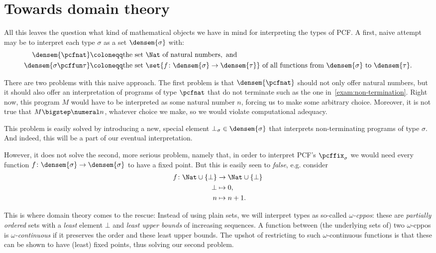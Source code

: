 \section{Towards domain theory}

All this leaves the question what kind of mathematical objects we have in mind
for interpreting the types of PCF. A first, naive attempt may be to interpret
each type \(\sigma\) as a set \(\densem{\sigma}\) with:
\begin{align*}
  \densem{\pcfnat} &\coloneqq \text{the set \(\Nat\) of natural numbers}, \text{ and} \\
  \densem{\sigma \pcffun \tau} &\coloneqq \text{the set \(\set{f \colon \densem{\sigma} \to
    \densem{\tau}}\) of all functions from \(\densem{\sigma}\) to \(\densem{\tau}\)}.
\end{align*}

There are two problems with this naive approach.
%
The first problem is that \(\densem{\pcfnat}\) should not only offer natural
numbers, but it should also offer an interpretation of programs of type
\(\pcfnat\) that do not terminate such as the one
in~\cref{exam:non-termination}.
%
Right now, this program \(M\) would have to be interpreted as some natural
number \(n\), forcing us to make some arbitrary choice. Moreover, it is not true
that \(M \bigstep \numeral n\), whatever choice we make, so we would violate
computational adequacy.

This problem is easily solved by introducing a new, special element
\(\bot_\sigma \in \densem{\sigma}\) that interprets non-terminating programs
of type \(\sigma\). And indeed, this will be a part of our eventual interpretation.

However, it does not solve the second, more serious problem, namely that, in
order to interpret PCF's \(\pcffix_\sigma\) we would need every function
\(f \colon \densem{\sigma} \to \densem{\sigma}\) to have a fixed point.
%
But this is easily seen to \emph{false}, e.g. consider
\begin{align*}
  f \colon \Nat \cup \{\bot\} &\to \Nat \cup \{\bot\} \\
  \bot &\mapsto 0, \\
  n &\mapsto n+1.
\end{align*}

This is where domain theory comes to the rescue: Instead of using plain sets, we
will interpret types as so-called \emph{\(\omega\)-cppos}: these are
\emph{partially ordered} sets with a \emph{least} element \(\bot\) and
\emph{least upper bounds} of increasing sequences.
%
A function between (the underlying sets of) two \(\omega\)-cppos is
\emph{\(\omega\)-continuous} if it preserves the order and these least upper
bounds.
%
The upshot of restricting to such \(\omega\)-continuous functions is that these
can be shown to have (least) fixed points, thus solving our second problem.

